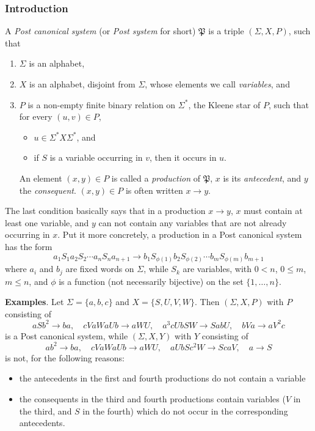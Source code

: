 \documentclass[12pt]{article}
\begin{document}
\subsubsection*{Introduction}

A \emph{Post canonical system} (or \emph{Post system} for short) $\mathfrak{P}$ is a triple $(\Sigma,X,P)$, such that
\begin{enumerate}
\item $\Sigma$ is an alphabet, 
\item $X$ is an alphabet, disjoint from $\Sigma$, whose elements we call \emph{variables}, and 
\item $P$ is a non-empty finite binary relation on $\Sigma^*$, the Kleene star of $P$, such that for every $(u,v)\in P$, 
\begin{itemize}
\item $u\in \Sigma^*X\Sigma^*$, and 
\item if $S$ is a variable occurring in $v$, then it occurs in $u$.  
\end{itemize}
An element $(x,y)\in P$ is called a \emph{production} of $\mathfrak{P}$, $x$ is its \emph{antecedent}, and $y$ the \emph{consequent}.  $(x,y)\in P$ is often written $x\to y$.  
\end{enumerate}
The last condition basically says that in a production $x\to y$, $x$ must contain at least one variable, and $y$ can not contain any variables that are not already occurring in $x$.  Put it more concretely, a production in a Post canonical system has the form 
\begin{equation}
a_1S_1a_2S_2\cdots a_nS_na_{n+1} \to b_1S_{\phi(1)}b_2S_{\phi(2)}\cdots b_mS_{\phi(m)}b_{m+1}
\end{equation}
where $a_i$ and $b_j$ are fixed words on $\Sigma$, while $S_k$ are variables, with $0<n$, $0\le m$, $m\le n$, and $\phi$ is a function (not necessarily bijective) on the set $\lbrace 1,\ldots, n\rbrace$.

\textbf{Examples}.  Let $\Sigma=\lbrace a,b,c\rbrace$ and $X=\lbrace S,U,V,W\rbrace$.  Then $(\Sigma,X,P)$ with $P$ consisting of $$aSb^2\to ba,\quad cVaWaUb\to aWU,\quad a^3cUbSW \to SabU,\quad bVa \to aV^2c$$ is a Post canonical system, while $(\Sigma,X,Y)$ with $Y$ consisting of $$ab^2\to ba,\quad cVaWaUb\to aWU,\quad aUbSc^2W \to ScaV,\quad a\to S$$ is not, for the following reasons:
\begin{itemize}
\item the antecedents in the first and fourth productions do not contain a variable
\item the consequents in the third and fourth productions contain variables ($V$ in the third, and $S$ in the fourth) which do not occur in the corresponding antecedents.
\end{itemize}
\end{document}
